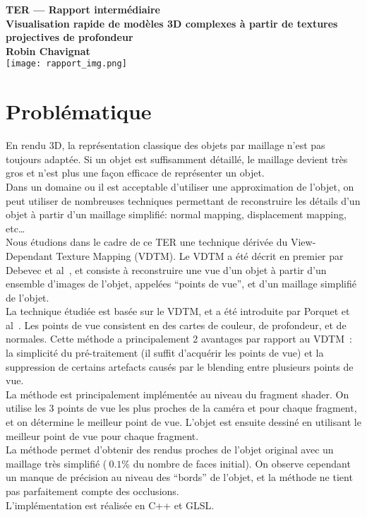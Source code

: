 \documentclass{report}
\begin{document}
\begin{titlepage}
    \centering
    \vfill
    \vfill
    {\bfseries\Large
        TER --- Rapport intermédiaire\\
        Visualisation rapide de modèles 3D complexes à partir de textures projectives de profondeur\\
        Robin Chavignat\\
    }    
    \vfill
    \vfill
    \texttt{[image: rapport\_img.png]} %
    \vfill
    \vfill
\end{titlepage}
\pagestyle{fancy}
\section*{Problématique}
En rendu 3D, la représentation classique des objets par maillage n'est pas toujours adaptée. Si
un objet est suffisamment détaillé, le maillage devient très gros et n'est plus une façon efficace de représenter un
objet.\\
Dans un domaine ou il est acceptable d'utiliser une approximation de l'objet, on peut utiliser de nombreuses techniques
permettant de reconstruire les détails d'un objet à partir d'un maillage simplifié: normal mapping, displacement mapping, etc\ldots\\
Nous étudions dans le cadre de ce TER une technique dérivée du View-Dependant Texture Mapping (VDTM). Le VDTM a été décrit en premier par Debevec et
al~\cite{Debevec98}, et consiste à reconstruire une vue d'un objet à partir d'un ensemble d'images de l'objet, appelées
``points de vue'', et d'un maillage simplifié de l'objet.\\
La technique étudiée est basée sur le VDTM, et a été introduite par Porquet et al~\cite{Porquet05}. Les points de vue
consistent en des cartes de couleur, de profondeur, et de normales. Cette méthode a principalement 2 avantages par
rapport au VDTM~: la simplicité du pré-traitement (il suffit d'acquérir les points de vue) et la suppression de certains
artefacts causés par le blending entre plusieurs points de vue.\\
La méthode est principalement implémentée au niveau du fragment shader. On utilise les 3 points de
vue les plus proches de la caméra et pour chaque fragment, et on détermine le meilleur point de vue. L'objet est ensuite
dessiné en utilisant le meilleur point de vue pour chaque fragment.\\
La méthode permet d'obtenir des rendus proches de l'objet original avec un maillage très simplifié ($~0.1\%$ du nombre
de faces initial). On observe cependant un manque de précision au niveau des ``bords'' de l'objet, et la méthode ne
tient pas parfaitement compte des occlusions.\\
L'implémentation est réalisée en C++ et GLSL.\\
\pagebreak
\end{document}
